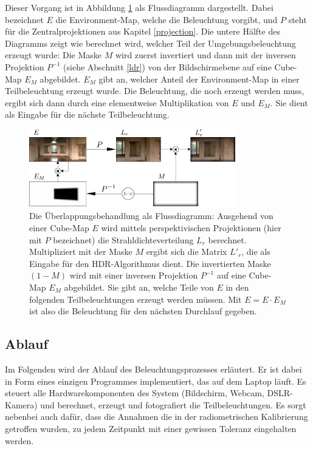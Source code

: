    Dieser Vorgang ist in Abbildung \ref{fig:overlap_flow} als Flussdiagramm dargestellt.
   Dabei bezeichnet $E$ die Environment-Map, welche die Beleuchtung vorgibt, und $P$ steht für die Zentralprojektionen aus Kapitel \ref{projection}. 
   Die untere Hälfte des Diagramms zeigt wie berechnet wird, welcher Teil der Umgebungsbeleuchtung erzeugt wurde:
   Die Maske $M$ wird zuerst invertiert und dann mit der inversen Projektion $P^{-1}$ (siehe Abschnitt \ref{ldr}) von der Bildschirmebene auf eine Cube-Map $E_M$ abgebildet.
   $E_M$ gibt an, welcher Anteil der Environment-Map in einer Teilbeleuchtung erzeugt wurde.
   Die Beleuchtung, die noch erzeugt werden muss, ergibt sich dann durch eine elementweise Multiplikation von $E$ und $E_M$.
   Sie dient als Eingabe für die nächste Teilbeleuchtung.
      
   \begin{figure}[h]
    \centering
    \includegraphics[width=0.8\textwidth]{../graphics/beleuchtung/overlap_flow.png}
    \caption[Flussdiagramm: Überlappungsbehandlung]{ Die Überlappungsbehandlung als Flussdiagramm:
       Ausgehend von einer Cube-Map $E$ wird mittels perspektivischen Projektionen (hier mit $P$ bezeichnet) die Strahldichteverteilung $L_r$ berechnet. 
       Multipliziert mit der Maske $M$ ergibt sich die Matrix $L'_r$, die  als Eingabe für den HDR-Algorithmus dient.
       Die invertierten Maske $(1-M)$ wird mit einer inversen Projektion $P^{-1}$ auf eine Cube-Map $E_M$ abgebildet.
       Sie gibt an, welche Teile von $E$ in den folgenden Teilbeleuchtungen erzeugt werden müssen. Mit $E = E \cdot E_M$ ist also die Beleuchtung für den nächsten Durchlauf gegeben.
     }
    \label{fig:overlap_flow}
   \end{figure}



 
  \subsection{Ablauf}   \label{illuminate}
    
   Im Folgenden wird der Ablauf des Beleuchtungsprozesses erläutert. 
   Er ist dabei in Form eines einzigen Programmes implementiert, das auf dem Laptop läuft.
   Es steuert alle Hardwarekomponenten des System (Bildschirm, Webcam, DSLR-Kamera) und berechnet, erzeugt und fotografiert die Teilbeleuchtungen.
   Es sorgt nebenbei auch dafür, dass die Annahmen die in der radiometrischen Kalibrierung getroffen wurden, zu jedem Zeitpunkt mit einer gewissen Toleranz eingehalten werden.
  
